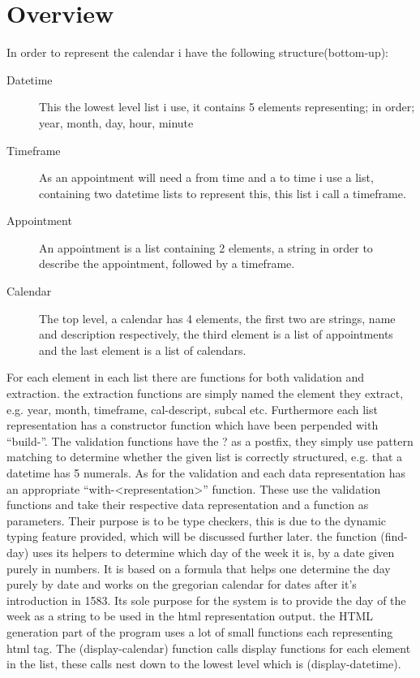 \documentclass[11pt,a4paper,article,oneside]{memoir}
\begin{document}
\section{Overview}
In order to represent the calendar i have the following structure(bottom-up):
\begin{description}
        \item [Datetime] This the lowest level list i use, it contains 5 elements representing; in order; year, month, day, hour, minute
        \item [Timeframe] As an appointment will need a from time and a to time i use a list, containing two datetime lists to represent this, this list i call a timeframe.
        \item [Appointment] An appointment is a list containing 2 elements, a string in order to describe the appointment, followed by a timeframe.
        \item [Calendar] The top level, a calendar has 4 elements, the first two are strings, name and description respectively, the third element is a list of appointments and the last element is a list of calendars.
\end{description}
For each element in each list there are functions for both validation and extraction.
the extraction functions are simply named the element they extract, e.g. year, month, timeframe, cal-descript, subcal etc.
Furthermore each list representation has a constructor function which have been perpended with ``build-''.
The validation functions have the ? as a postfix, they simply use pattern matching to determine whether the given list is correctly structured, e.g. that a datetime has 5 numerals.
\bigskip \noindent
As for the validation and each data representation has an appropriate ``with-<representation>'' function.
These use the validation functions and take their respective data representation and a function as parameters.
Their purpose is to be type checkers, this is due to the dynamic typing feature provided, which will be discussed further later.
\bigskip \noindent
the function (find-day) uses its helpers to determine which day of the week it is, by a date given purely in numbers.
It is based on a formula that helps one determine the day purely by date and works on the gregorian calendar for dates after it's introduction in 1583.
Its sole purpose for the system is to provide the day of the week as a string to be used in the html representation output.
\bigskip \noindent
the HTML generation part of the program uses a lot of small functions each representing html tag.
The (display-calendar) function calls display functions for each element in the list, these calls nest down to the lowest level which is (display-datetime).
\end{document}
